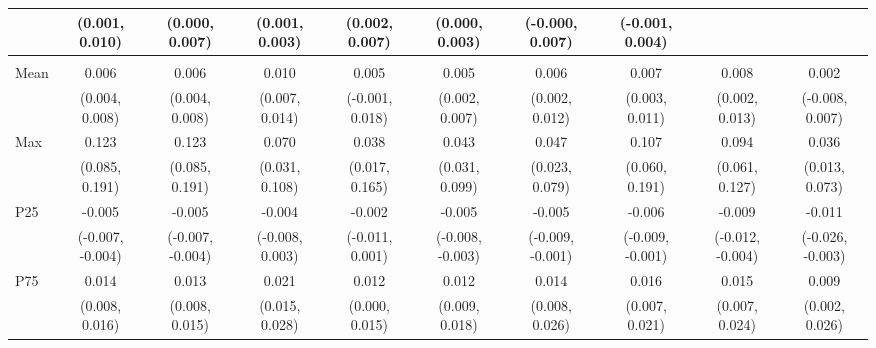 {\begin{tabular}{l|c|c|c|c|c|c|c|c|c}
& {\scriptsize (0.001, 0.010)}
& {\scriptsize (0.000, 0.007)}
& {\scriptsize (0.001, 0.003)}
& {\scriptsize (0.002, 0.007)}
& {\scriptsize (0.000, 0.003)}
& {\scriptsize (-0.000, 0.007)}
& {\scriptsize (-0.001, 0.004)}
\\ [0.1cm]
\hline
\noalign{\smallskip}
\multicolumn{10}{l}{\textbf{Effect with Leads and Lags}} \\
\noalign{\smallskip}
\hline
Mean
& 0.006 & 0.006 & 0.010 & 0.005 & 0.005 & 0.006 & 0.007 & 0.008 & 0.002 \\
& {\scriptsize (0.004, 0.008)}
& {\scriptsize (0.004, 0.008)}
& {\scriptsize (0.007, 0.014)}
& {\scriptsize (-0.001, 0.018)}
& {\scriptsize (0.002, 0.007)}
& {\scriptsize (0.002, 0.012)}
& {\scriptsize (0.003, 0.011)}
& {\scriptsize (0.002, 0.013)}
& {\scriptsize (-0.008, 0.007)}
\\ [0.1cm]
\hline
Max
& 0.123 & 0.123 & 0.070 & 0.038 & 0.043 & 0.047 & 0.107 & 0.094 & 0.036 \\
& {\scriptsize (0.085, 0.191)}
& {\scriptsize (0.085, 0.191)}
& {\scriptsize (0.031, 0.108)}
& {\scriptsize (0.017, 0.165)}
& {\scriptsize (0.031, 0.099)}
& {\scriptsize (0.023, 0.079)}
& {\scriptsize (0.060, 0.191)}
& {\scriptsize (0.061, 0.127)}
& {\scriptsize (0.013, 0.073)}
\\ [0.1cm]
\hline
P25
& -0.005 & -0.005 & -0.004 & -0.002 & -0.005 & -0.005 & -0.006 & -0.009 & -0.011 \\
& {\scriptsize (-0.007, -0.004)}
& {\scriptsize (-0.007, -0.004)}
& {\scriptsize (-0.008, 0.003)}
& {\scriptsize (-0.011, 0.001)}
& {\scriptsize (-0.008, -0.003)}
& {\scriptsize (-0.009, -0.001)}
& {\scriptsize (-0.009, -0.001)}
& {\scriptsize (-0.012, -0.004)}
& {\scriptsize (-0.026, -0.003)}
\\ [0.1cm]
\hline
P75
& 0.014 & 0.013 & 0.021 & 0.012 & 0.012 & 0.014 & 0.016 & 0.015 & 0.009 \\
& {\scriptsize (0.008, 0.016)}
& {\scriptsize (0.008, 0.015)}
& {\scriptsize (0.015, 0.028)}
& {\scriptsize (0.000, 0.015)}
& {\scriptsize (0.009, 0.018)}
& {\scriptsize (0.008, 0.026)}
& {\scriptsize (0.007, 0.021)}
& {\scriptsize (0.007, 0.024)}
& {\scriptsize (0.002, 0.026)}
\\ [0.1cm]
\hline
\hline
\end{tabular}
}

